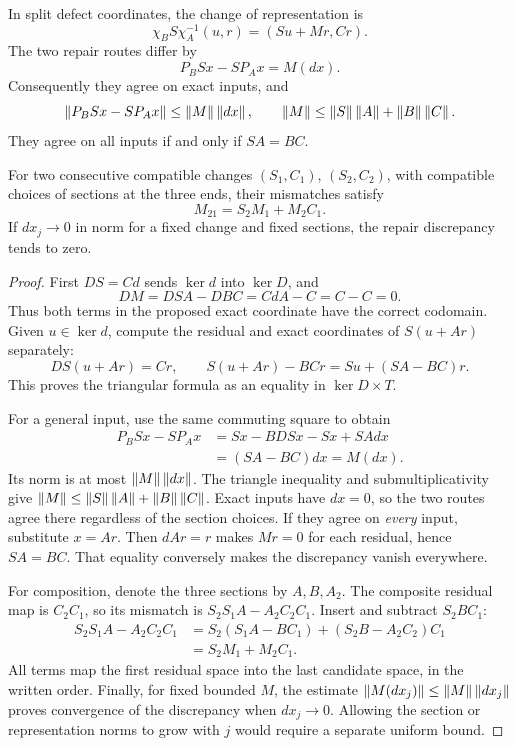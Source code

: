 \begin{theorem}\label{KS66}
In split defect coordinates, the change of representation is
\begin{equation}\label{eq:triangular-chart}
 \chi_BS\chi_A^{-1}(u,r)=(Su+Mr,Cr).
\end{equation}
The two repair routes differ by
\begin{equation}\label{eq:repair-change}
 P_BSx-SP_Ax=M(dx).
\end{equation}
Consequently they agree on exact inputs, and
\[
 \left\lVert P_BSx-SP_Ax\right\rVert\le\left\lVert M\right\rVert\left\lVert dx\right\rVert,
 \qquad \left\lVert M\right\rVert\le\left\lVert S\right\rVert\left\lVert A\right\rVert+\left\lVert B\right\rVert\left\lVert C\right\rVert.
\]
They agree on all inputs if and only if \(SA=BC\).

For two consecutive compatible changes \((S_1,C_1)\), \((S_2,C_2)\), with compatible choices of sections at the three ends, their mismatches satisfy
\[
 M_{21}=S_2M_1+M_2C_1.
\]
If \(dx_j\to0\) in norm for a fixed change and fixed sections, the repair discrepancy tends to zero.
\end{theorem}
\begin{proof}
First \(DS=Cd\) sends \(\ker d\) into \(\ker D\), and
\[
 DM=DSA-DBC=CdA-C=C-C=0.
\]
Thus both terms in the proposed exact coordinate have the correct codomain. Given \(u\in\ker d\), compute the residual and exact coordinates of \(S(u+Ar)\) separately:
\[
 DS(u+Ar)=Cr,\qquad
 S(u+Ar)-BCr=Su+(SA-BC)r.
\]
This proves the triangular formula as an equality in \(\ker D\times T\).

For a general input, use the same commuting square to obtain
\[
 \begin{aligned}
 P_BSx-SP_Ax
 &=Sx-BDSx-Sx+SAdx\\
 &=(SA-BC)dx=M(dx).
 \end{aligned}
\]
Its norm is at most \(\left\lVert M\right\rVert\left\lVert dx\right\rVert\). The triangle inequality and submultiplicativity give \(\left\lVert M\right\rVert\le\left\lVert S\right\rVert\left\lVert A\right\rVert+\left\lVert B\right\rVert\left\lVert C\right\rVert\). Exact inputs have \(dx=0\), so the two routes agree there regardless of the section choices. If they agree on \emph{every} input, substitute \(x=Ar\). Then \(dAr=r\) makes \(Mr=0\) for each residual, hence \(SA=BC\). That equality conversely makes the discrepancy vanish everywhere.

For composition, denote the three sections by \(A,B,A_2\). The composite residual map is \(C_2C_1\), so its mismatch is \(S_2S_1A-A_2C_2C_1\). Insert and subtract \(S_2BC_1\):
\[
 \begin{aligned}
 S_2S_1A-A_2C_2C_1
 &=S_2(S_1A-BC_1)+(S_2B-A_2C_2)C_1\\
 &=S_2M_1+M_2C_1.
 \end{aligned}
\]
All terms map the first residual space into the last candidate space, in the written order. Finally, for fixed bounded \(M\), the estimate \(\left\lVert M(dx_j)\right\rVert\le\left\lVert M\right\rVert\left\lVert dx_j\right\rVert\) proves convergence of the discrepancy when \(dx_j\to0\). Allowing the section or representation norms to grow with \(j\) would require a separate uniform bound.
\end{proof}
